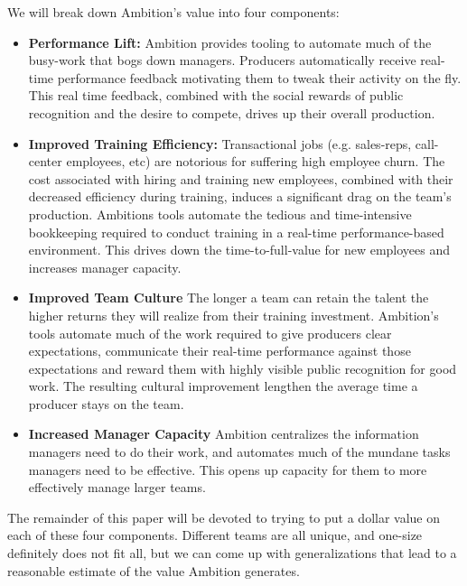 \documentclass[paper=a4, fontsize=11pt abstract]{scrartcl}
\numberwithin{equation}{section}		%
\numberwithin{figure}{section}			%
\numberwithin{table}{section}				%
\begin{document}
We will break down Ambition's value into four components:
\begin{itemize}
    \item \textbf{Performance Lift:} Ambition provides tooling to automate much of the busy-work that bogs down managers.  Producers automatically receive real-time performance feedback motivating them to tweak their activity on the fly. This real time feedback, combined with the social rewards of public recognition and the desire to compete, drives up their overall production.
    \item \textbf{Improved Training Efficiency:} Transactional jobs (e.g. sales-reps, call-center employees, etc) are notorious for suffering high employee churn.  The cost associated with hiring and training new employees, combined with their decreased efficiency during training, induces a significant drag on the team's production. Ambitions tools automate the tedious and time-intensive bookkeeping required to conduct training in a real-time performance-based environment. This drives down the time-to-full-value for new employees and increases manager capacity.
    \item \textbf{Improved Team Culture} The longer a team can retain the talent the higher returns they will realize from their training investment.  Ambition's tools automate much of the work required to give producers clear expectations, communicate their real-time performance against those expectations and reward them with highly visible public recognition for good work. The resulting cultural improvement lengthen the average time a producer stays on the team.
    \item \textbf{Increased Manager Capacity} Ambition centralizes the information managers need to do their work, and automates much of the mundane tasks managers need to be effective.  This opens up capacity for them to more effectively manage larger teams. 
\end{itemize}
The remainder of this paper will be devoted to trying to put a dollar value on each of these four components.  Different teams are all unique, and one-size definitely does not fit all, but we can come up with generalizations that lead to a reasonable estimate of the value Ambition generates.
\end{document}
